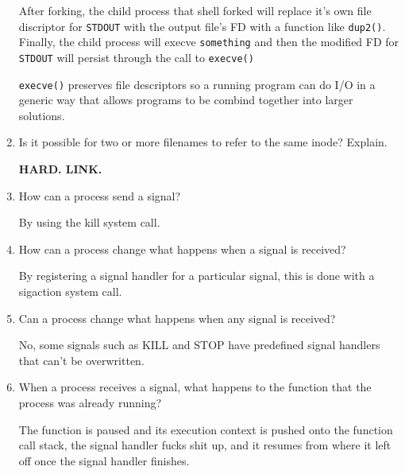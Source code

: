 \begin{enumerate}
\begin{ans}
    After forking, the child process that shell forked will replace it's own
    file discriptor for \texttt{STDOUT} with the output file's FD with a
    function like \texttt{dup2()}. Finally, the child process will execve
    \texttt{something} and then the modified FD for \texttt{STDOUT} will persist
    through the call to \texttt{execve()}

    \texttt{execve()} preserves file descriptors so a running program can do I/O
    in a generic way that allows programs to be combind together into larger solutions.
  \end{ans}

\item Is it possible for two or more filenames to refer to the same inode?
  Explain.
  \begin{ans}
    {\large \bfseries HARD. LINK.}
  \end{ans}
  
\item How can a process send a signal?
  \begin{ans}
    By using the kill system call.
  \end{ans}
  
\item How can a process change what happens when a signal is received?
  \begin{ans}
    By registering a signal handler for a particular signal, this is done with a
    sigaction system call.
  \end{ans}
\item Can a process change what happens when any signal is received?
  \begin{ans}
    No, some signals such as KILL and STOP have predefined signal handlers that
    can't be overwritten.
  \end{ans}
  
\item When a process receives a signal, what happens to the function that the
  process was already running?
  \begin{ans}
    The function is paused and its execution context is pushed onto the function
    call stack, the signal handler fucks shit up,
    and it resumes from where it left off once the signal handler finishes.
  \end{ans}
  

\end{enumerate}
